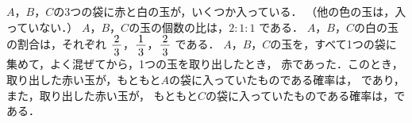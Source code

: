 \documentclass[../../../../uem_mat_mei_q.tex]{subfiles}
\begin{document}
    $A$，$B$，$C$の3つの袋に赤と白の玉が，いくつか入っている．%
    （他の色の玉は，入っていない．）%
    $A$，$B$，$C$の玉の個数の比は，$2:1:1$ である．%
    $A$，$B$，$C$の白の玉の割合は，それぞれ %
    $\myfraca{2}{3}$，$\myfraca{1}{3}$，$\myfraca{2}{3}$ である．%
    $A$，$B$，$C$の玉を，すべて1つの袋に集めて，よく混ぜてから，1つの玉を取り出したとき，%
    赤であった．このとき，取り出した赤い玉が，もともと$A$の袋に入っていたものである確率は，%
    \:であり，また，取り出した赤い玉が，%
    もともと$C$の袋に入っていたものである確率は，\:である．
\end{document}
